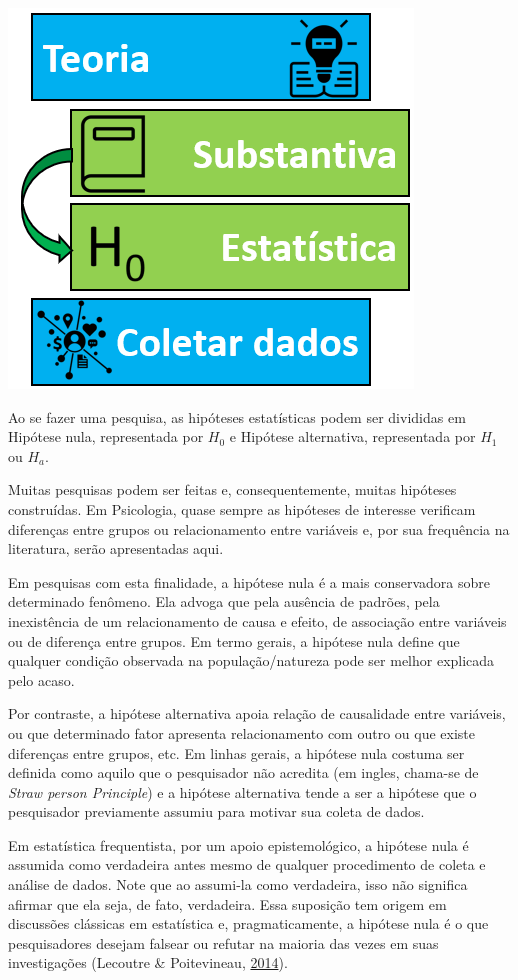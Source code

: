 \documentclass[
]{book}
\begin{document}
\includegraphics{./img/cap_inferencia_tipos_hipoteses.png}

Ao se fazer uma pesquisa, as hipóteses estatísticas podem ser divididas
em Hipótese nula, representada por \(H_0\) e Hipótese alternativa,
representada por \(H_1\) ou \(H_a\).

Muitas pesquisas podem ser feitas e, consequentemente, muitas hipóteses
construídas. Em Psicologia, quase sempre as hipóteses de interesse
verificam diferenças entre grupos ou relacionamento entre variáveis e,
por sua frequência na literatura, serão apresentadas aqui.

Em pesquisas com esta finalidade, a hipótese nula é a mais conservadora
sobre determinado fenômeno. Ela advoga que pela ausência de padrões,
pela inexistência de um relacionamento de causa e efeito, de associação
entre variáveis ou de diferença entre grupos. Em termo gerais, a
hipótese nula define que qualquer condição observada na
população/natureza pode ser melhor explicada pelo acaso.

Por contraste, a hipótese alternativa apoia relação de causalidade entre
variáveis, ou que determinado fator apresenta relacionamento com outro
ou que existe diferenças entre grupos, etc. Em linhas gerais, a hipótese
nula costuma ser definida como aquilo que o pesquisador não acredita (em
ingles, chama-se de \emph{Straw person Principle}) e a hipótese
alternativa tende a ser a hipótese que o pesquisador previamente assumiu
para motivar sua coleta de dados.

Em estatística frequentista, por um apoio epistemológico, a hipótese
nula é assumida como verdadeira antes mesmo de qualquer procedimento de
coleta e análise de dados. Note que ao assumi-la como verdadeira, isso
não significa afirmar que ela seja, de fato, verdadeira. Essa suposição
tem origem em discussões clássicas em estatística e, pragmaticamente, a
hipótese nula é o que pesquisadores desejam falsear ou refutar na
maioria das vezes em suas investigações (Lecoutre \& Poitevineau,
\protect\hyperlink{ref-Lecoutre2014}{2014}).
\end{document}
